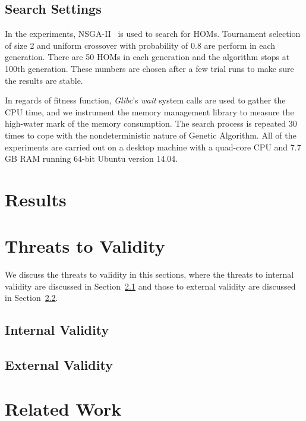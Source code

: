 \documentclass[oribibl]{llncs}
\begin{document}
\subsection{Search Settings}
\label{sec_searchsetting}

In the experiments, NSGA-II~\cite{996017} is used to search for HOMs.
Tournament selection of size 2 and uniform crossover with probability of 0.8 are perform in each generation.
There are 50 HOMs in each generation and the algorithm stops at 100th generation.
These numbers are chosen after a few trial runs to make sure the results are stable.

In regards of fitness function, \emph{Glibc}'s \emph{wait} system calls are used to gather the CPU time, and we instrument the memory management library to measure the high-water mark of the memory consumption.
The search process is repeated 30 times to cope with the nondeterministic nature of Genetic Algorithm.
All of the experiments are carried out on a desktop machine with a quad-core CPU and 7.7 GB RAM running 64-bit Ubuntu version 14.04.

\section{Results}
\label{sec_result}

\section{Threats to Validity}
\label{sec_threat}

We discuss the threats to validity in this sections, where the threats to internal validity are discussed in Section~\ref{sec_internalvalidity} and those to external validity are discussed in Section~\ref{sec_externalvalidity}.

\subsection{Internal Validity}
\label{sec_internalvalidity}

\subsection{External Validity}
\label{sec_externalvalidity}

\section{Related Work}
\label{sec_related}
\end{document}
